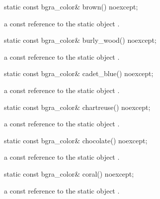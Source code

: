 \begin{itemdecl}
static const bgra_color& brown() noexcept;
\end{itemdecl}
\begin{itemdescr}
\pnum
\returns
a const reference to the static  object .
\end{itemdescr}

\begin{itemdecl}
static const bgra_color& burly_wood() noexcept;
\end{itemdecl}
\begin{itemdescr}
\pnum
\returns
a const reference to the static  object .
\end{itemdescr}

\begin{itemdecl}
static const bgra_color& cadet_blue() noexcept;
\end{itemdecl}
\begin{itemdescr}
\pnum
\returns
a const reference to the static  object .
\end{itemdescr}

\begin{itemdecl}
static const bgra_color& chartreuse() noexcept;
\end{itemdecl}
\begin{itemdescr}
\pnum
\returns
a const reference to the static  object .
\end{itemdescr}

\begin{itemdecl}
static const bgra_color& chocolate() noexcept;
\end{itemdecl}
\begin{itemdescr}
\pnum
\returns
a const reference to the static  object .
\end{itemdescr}

\begin{itemdecl}
static const bgra_color& coral() noexcept;
\end{itemdecl}
\begin{itemdescr}
\pnum
\returns
a const reference to the static  object .
\end{itemdescr}

